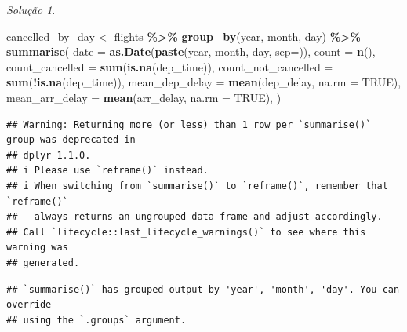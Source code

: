 \documentclass[
]{latex/krantz}
\newenvironment{Shaded}{\begin{snugshade}}{\end{snugshade}}
\newcommand{\AttributeTok}[1]{\textcolor[rgb]{0.13,0.29,0.53}{#1}}
\newcommand{\ConstantTok}[1]{\textcolor[rgb]{0.56,0.35,0.01}{#1}}
\newcommand{\FunctionTok}[1]{\textcolor[rgb]{0.13,0.29,0.53}{\textbf{#1}}}
\newcommand{\NormalTok}[1]{#1}
\newcommand{\OtherTok}[1]{\textcolor[rgb]{0.56,0.35,0.01}{#1}}
\newcommand{\SpecialCharTok}[1]{\textcolor[rgb]{0.81,0.36,0.00}{\textbf{#1}}}
\newcommand{\StringTok}[1]{\textcolor[rgb]{0.31,0.60,0.02}{#1}}
\theoremstyle{definition}
\theoremstyle{definition}
\theoremstyle{definition}
\theoremstyle{definition}
\theoremstyle{remark}
\newtheorem*{solution}{Solução}
\begin{document}
\begin{solution}
\leavevmode

\begin{Shaded}
\begin{Highlighting}[]
\NormalTok{cancelled\_by\_day }\OtherTok{\textless{}{-}}\NormalTok{ flights }\SpecialCharTok{\%\textgreater{}\%}
                        \FunctionTok{group\_by}\NormalTok{(year, month, day) }\SpecialCharTok{\%\textgreater{}\%}
                        \FunctionTok{summarise}\NormalTok{(}
                            \AttributeTok{date =} \FunctionTok{as.Date}\NormalTok{(}\FunctionTok{paste}\NormalTok{(year, month, day, }\AttributeTok{sep=}\StringTok{\textquotesingle{}{-}\textquotesingle{}}\NormalTok{)),}
                            \AttributeTok{count =} \FunctionTok{n}\NormalTok{(),}
                            \AttributeTok{count\_cancelled =} \FunctionTok{sum}\NormalTok{(}\FunctionTok{is.na}\NormalTok{(dep\_time)),}
                            \AttributeTok{count\_not\_cancelled =} \FunctionTok{sum}\NormalTok{(}\SpecialCharTok{!}\FunctionTok{is.na}\NormalTok{(dep\_time)),}
                            \AttributeTok{mean\_dep\_delay =} \FunctionTok{mean}\NormalTok{(dep\_delay, }\AttributeTok{na.rm =} \ConstantTok{TRUE}\NormalTok{),}
                            \AttributeTok{mean\_arr\_delay =} \FunctionTok{mean}\NormalTok{(arr\_delay, }\AttributeTok{na.rm =} \ConstantTok{TRUE}\NormalTok{),}
\NormalTok{                        )}
\end{Highlighting}
\end{Shaded}

\begin{verbatim}
## Warning: Returning more (or less) than 1 row per `summarise()` group was deprecated in
## dplyr 1.1.0.
## i Please use `reframe()` instead.
## i When switching from `summarise()` to `reframe()`, remember that `reframe()`
##   always returns an ungrouped data frame and adjust accordingly.
## Call `lifecycle::last_lifecycle_warnings()` to see where this warning was
## generated.
\end{verbatim}

\begin{verbatim}
## `summarise()` has grouped output by 'year', 'month', 'day'. You can override
## using the `.groups` argument.
\end{verbatim}


\end{solution}
\end{document}
